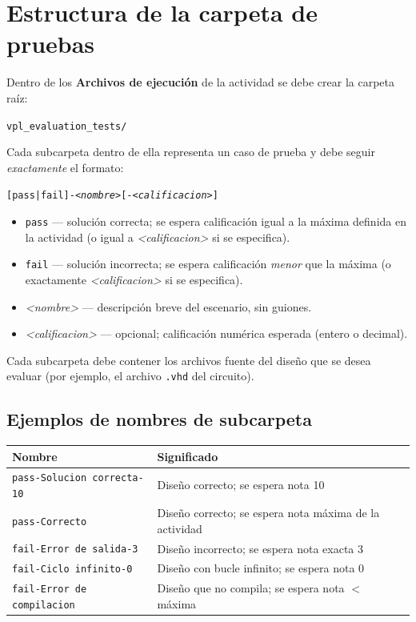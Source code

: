 \documentclass[12pt, a4paper, twoside, openany]{book}
\begin{document}
\section{Estructura de la carpeta de pruebas}
\label{sec:test-estructura}

Dentro de los \textbf{Archivos de ejecución} de la actividad se debe crear la
carpeta raíz:

\begin{center}
  \texttt{vpl\_evaluation\_tests/}
\end{center}

Cada subcarpeta dentro de ella representa un caso de prueba y debe seguir
\emph{exactamente} el formato:

\begin{center}
  \texttt{[pass|fail]-\textit{<nombre>}[-\textit{<calificacion>}]}
\end{center}

\begin{itemize}
  \item \texttt{pass} — solución correcta; se espera calificación igual a la
        máxima definida en la actividad (o igual a \textit{<calificacion>} si
        se especifica).
  \item \texttt{fail} — solución incorrecta; se espera calificación
        \emph{menor} que la máxima (o exactamente \textit{<calificacion>} si
        se especifica).
  \item \textit{<nombre>} — descripción breve del escenario, sin guiones.
  \item \textit{<calificacion>} — opcional; calificación numérica esperada
        (entero o decimal).
\end{itemize}

Cada subcarpeta debe contener los archivos fuente del diseño que se desea
evaluar (por ejemplo, el archivo \texttt{.vhd} del circuito).

\subsection{Ejemplos de nombres de subcarpeta}

\begin{center}
\begin{tabular}{L{5.5cm} L{8cm}}
  \toprule
  \textbf{Nombre} & \textbf{Significado} \\
  \midrule
  \texttt{pass-Solucion correcta-10}  & Diseño correcto; se espera nota 10 \\
  \texttt{pass-Correcto}              & Diseño correcto; se espera nota máxima de la actividad \\
  \texttt{fail-Error de salida-3}     & Diseño incorrecto; se espera nota exacta 3 \\
  \texttt{fail-Ciclo infinito-0}      & Diseño con bucle infinito; se espera nota 0 \\
  \texttt{fail-Error de compilacion}  & Diseño que no compila; se espera nota $<$ máxima \\
  \bottomrule
\end{tabular}
\end{center}
\end{document}

